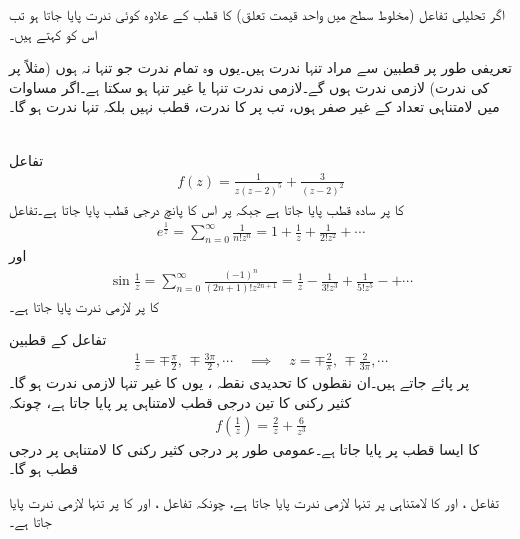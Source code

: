 اگر تحلیلی تفاعل  (مخلوط سطح میں واحد قیمت تعلق) کا قطب کے علاوہ کوئی ندرت پایا جاتا ہو تب اس کو  کہتے ہیں۔

تعریفی طور پر قطبین سے مراد تنہا ندرت ہیں۔یوں وہ تمام ندرت جو تنہا نہ ہوں (مثلاً  پر  کی ندرت) لازمی ندرت ہوں گے۔لازمی ندرت تنہا یا غیر تنہا ہو سکتا ہے۔اگر مساوات  میں لامتناہی تعداد کے  غیر صفر ہوں، تب  پر  کا ندرت، قطب نہیں بلکہ تنہا ندرت ہو گا۔

\quad {}\\
تفاعل
\begin{align*}
f(z)=\frac{1}{z(z-2)^5}+\frac{3}{(z-2)^2}
\end{align*}
کا  پر سادہ قطب پایا جاتا ہے جبکہ  پر اس کا پانچ درجی قطب پایا جاتا ہے۔تفاعل
\begin{align}
e^{\frac{1}{z}}=\sum\limits_{n=0}^{\infty} \frac{1}{n!z^n}=1+\frac{1}{z}+\frac{1}{2!z^2}+\cdots
\end{align}
اور
\begin{align}
\sin \frac{1}{z}=\sum\limits_{n=0}^{\infty} \frac{(-1)^n}{(2n+1)!z^{2n+1}}=\frac{1}{z}-\frac{1}{3!z^3}+\frac{1}{5!z^5}-+\cdots
\end{align}
کا  پر لازمی ندرت پایا جاتا ہے۔

تفاعل  کے قطبین
\begin{align*}
\frac{1}{z}=\mp\frac{\pi}{2},\,\mp\frac{3\pi}{2},\cdots \quad \implies \quad z=\mp \frac{2}{\pi},\, \mp \frac{2}{3\pi},\cdots
\end{align*}
پر پائے جاتے ہیں۔ان نقطوں کا تحدیدی نقطہ ، یوں  کا غیر تنہا لازمی ندرت ہو گا۔
\quad {}\\
کثیر رکنی  کا تین درجی قطب لامتناہی پر پایا جاتا ہے، چونکہ
\begin{align*}
f(\frac{1}{z})=\frac{2}{z}+\frac{6}{z^3}
\end{align*}
کا ایسا قطب  پر پایا جاتا ہے۔عمومی طور پر  درجی کثیر رکنی کا لامتناہی پر  درجی قطب ہو گا۔

تفاعل ،  اور  کا لامتناہی پر تنہا لازمی ندرت پایا جاتا ہے، چونکہ تفاعل ،  اور  کا  پر تنہا لازمی ندرت پایا جاتا ہے۔

